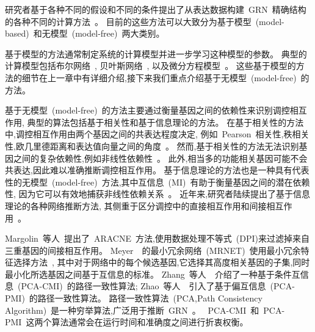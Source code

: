 研究者基于各种不同的假设和不同的条件提出了从表达数据构建~GRN~精确结构的各种不同的计算方法~\cite{longabaugh2005computational,karlebach2008modelling}。
目前的这些方法可以大致分为基于模型~(model-based)~和无模型~(model-free)~两大类别。

基于模型的方法通常制定系统的计算模型并进一步学习这种模型的参数。
典型的计算模型包括布尔网络~\cite{shmulevich2002probabilistic,kim2007boolean,bornholdt2008boolean,zhou2016relative},
贝叶斯网络~\cite{kim2003inferring,zou2004new,chen2006effective,needham2007primer,lo2015high},
以及微分方程模型~\cite{gardner2003inferring,di2005chemogenomic,bansal2006inference, honkela2010model,lu2011high,li2011large}。
这些基于模型的方法的细节在上一章中有详细介绍,接下来我们重点介绍基于无模型~(model-free)~的方法。

基于无模型~(model-free)~的方法主要通过衡量基因之间的依赖性来识别调控相互作用,
典型的算法包括基于相关性和基于信息理论的方法。
在基于相关性的方法中,调控相互作用由两个基因之间的共表达程度决定,
例如~Pearson~相关性,秩相关性,欧几里德距离和表达值向量之间的角度~\cite{wang2014review}。
然而,基于相关性的方法无法识别基因之间的复杂依赖性,例如非线性依赖性~\cite{ruyssinck2014nimefi}。
此外,相当多的功能相关基因可能不会共表达,因此难以准确推断调控相互作用。
基于信息理论的方法也是一种具有代表性的无模型~(model-free)~方法,其中互信息~(MI)~有助于衡量基因之间的潜在依赖性,
因为它可以有效地捕获非线性依赖关系~\cite{brunel2010miss,zhang2011inferring}。
近年来,研究者陆续提出了基于信息理论的各种网络推断方法,
其侧重于区分调控中的直接相互作用和间接相互作用~\cite{marbach2010revealing}。

Margolin~等人~\cite{margolin2006aracne}提出了~ARACNE~方法,使用数据处理不等式~(DPI)来过滤掉来自三重基因的间接相互作用。
Meyer~\cite{meyer2007information}~的最小冗余网络~(MRNET)~使用最小冗余特征选择方法~\cite{peng2005feature},
其中对于网络中的每个候选基因,它选择其高度相关基因的子集,同时最小化所选基因之间基于互信息的标准。
Zhang~等人~\cite{zhang2011inferring}~介绍了一种基于条件互信息~(PCA-CMI)~的路径一致性算法; 
Zhao~等人~\cite{zhao2016part}~引入了基于偏互信息~(PCA-PMI)~的路径一致性算法。
路径一致性算法~(PCA,Path Consistency Algorithm)~是一种穷举算法,广泛用于推断~GRN~\cite{zhang2011inferring}。
~PCA-CMI~和~PCA-PMI~这两个算法通常会在运行时间和准确度之间进行折衷权衡。

